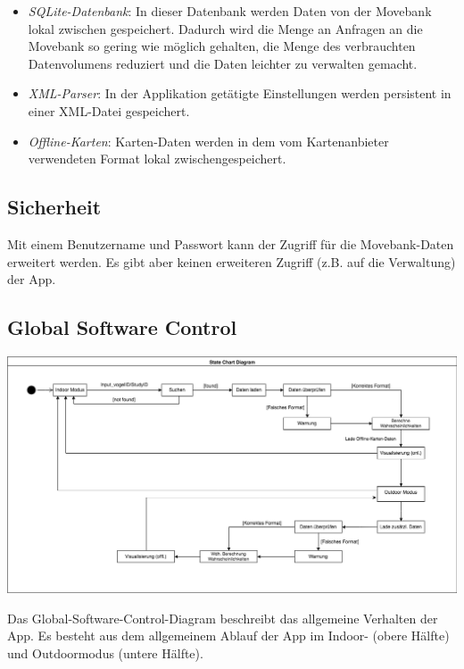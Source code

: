 \documentclass[12pt]{article} %
\begin{document}
\begin{itemize}
	\item \textit{SQLite-Datenbank}: In dieser Datenbank werden Daten von der Movebank lokal zwischen gespeichert. Dadurch wird die Menge an Anfragen an die Movebank so gering wie möglich gehalten, die Menge des verbrauchten Datenvolumens reduziert und die Daten leichter zu verwalten gemacht.
	
	\item \textit{XML-Parser}: In der Applikation getätigte Einstellungen werden persistent in einer XML-Datei gespeichert.
	
	\item \textit{Offline-Karten}: Karten-Daten werden in dem vom Kartenanbieter verwendeten Format lokal zwischengespeichert.
	
	
\end{itemize}



\subsection{Sicherheit}
Mit einem Benutzername und Passwort kann der Zugriff für die Movebank-Daten erweitert werden. Es gibt aber keinen erweiteren Zugriff (z.B. auf die Verwaltung) der App. 


\subsection{Global Software Control}

\includegraphics[width = \textwidth]{Diagramme/state_diagram.png}

\vspace{1em}

Das Global-Software-Control-Diagram beschreibt das allgemeine Verhalten der App. Es besteht aus dem allgemeinem Ablauf der App im Indoor- (obere Hälfte) und Outdoormodus (untere Hälfte). 
\end{document}

